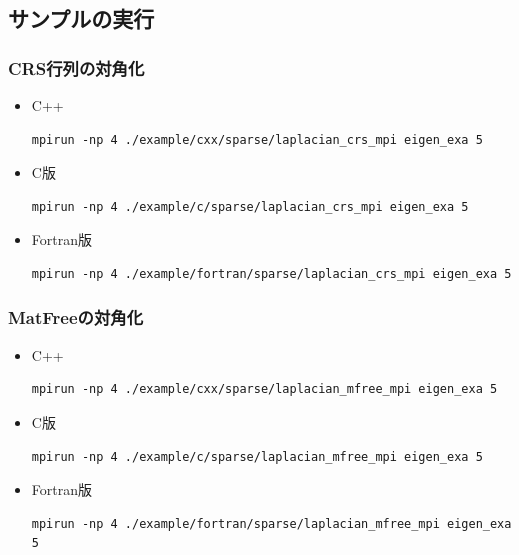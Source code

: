 \subsection*{サンプルの実行}
\begin{frame}[c,fragile]
  \frametitle{CRS行列の対角化}
  \begin{itemize}
  \item C++ 
\begin{lstlisting}[style=shstyle]
mpirun -np 4 ./example/cxx/sparse/laplacian_crs_mpi eigen_exa 5
\end{lstlisting}
  \item C版 
\begin{lstlisting}[style=shstyle]
mpirun -np 4 ./example/c/sparse/laplacian_crs_mpi eigen_exa 5
\end{lstlisting}
  \item Fortran版 
\begin{lstlisting}[style=shstyle]
mpirun -np 4 ./example/fortran/sparse/laplacian_crs_mpi eigen_exa 5
\end{lstlisting}
  \end{itemize}
\end{frame}

\begin{frame}[c,fragile]
  \frametitle{MatFreeの対角化}
  \begin{itemize}
  \item C++ 
\begin{lstlisting}[style=shstyle]
mpirun -np 4 ./example/cxx/sparse/laplacian_mfree_mpi eigen_exa 5
\end{lstlisting}
  \item C版 
\begin{lstlisting}[style=shstyle]
mpirun -np 4 ./example/c/sparse/laplacian_mfree_mpi eigen_exa 5
\end{lstlisting}
  \item Fortran版 
\begin{lstlisting}[style=shstyle]
mpirun -np 4 ./example/fortran/sparse/laplacian_mfree_mpi eigen_exa 5
\end{lstlisting}
  \end{itemize}
\end{frame}

